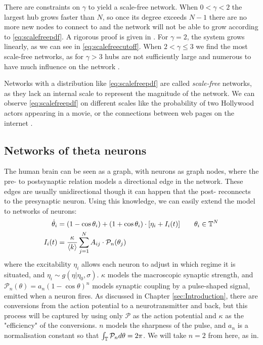 There are constraints on $\gamma$ to yield a scale-free network. When $0 < \gamma < 2$ the largest hub grows faster than $N$, so once its degree exceeds $N-1$ there are no more new nodes to connect to and the network will not be able to grow according to \eqref{eq:scalefreepdf}. A rigorous proof is given in \cite{Bassler2011}. For $\gamma = 2$, the system grows linearly, as we can see in \eqref{eq:scalefreecutoff}. When $2 < \gamma \leq 3$ we find the most scale-free networks, as for $\gamma > 3$ hubs are not sufficiently large and numerous to have much influence on the network
\cite{BarabasiNetworkBook2016}.

Networks with a distribution like \eqref{eq:scalefreepdf} are called \textit{scale-free} networks, as they lack an internal scale to represent the magnitude of the network. We can observe \eqref{eq:scalefreepdf} on different scales like the probability of two Hollywood actors appearing in a movie, or the connections between web pages on the internet \cite{Barabasi2003}.


\subsection{Networks of theta neurons}
The human brain can be seen as a graph, with neurons as graph nodes, where the pre- to postsynaptic relation models a directional edge in the network. These edges are usually unidirectional though it can happen that the post- reconnects to the presynaptic neuron. Using this knowledge, we can easily extend the model to networks of neurons:
\begin{align}
\dot{\theta}_{i} &=\left(1-\cos \theta_{i}\right)+\left(1+\cos \theta_{i}\right) \cdot \left[\eta_{i} + I_{i}(t)\right] \qquad \theta_i \in \T^N  \label{eq:thetaneuronnetwork} \\
I_{i}(t) &=\frac{\kappa}{\kmean} \sum_{j=1}^{N} A_{i j} \cdot \mathcal{P}_{n}(\theta_{j}) \label{eq:thetaneuronnetworkcurrent}
\end{align}
where the excitability $\eta_i$ allows each neuron to adjust in which regime it is situated, and $\eta_i \sim g(\eta \rvert \eta_0, \sigma)$. $\kappa$ models the macroscopic synaptic strength, and $\mathcal{P}_n(\theta)  = a_n(1 - \cos \theta)^n$ models synaptic coupling by a pulse-shaped signal, emitted when a neuron fires. As discussed in Chapter \ref{sec:Introduction}, there are conversions from the action potential to a neurotransmitter and back, but this process will be captured by using only $\mathcal{P}$ as the action potential and $\kappa$ as the "efficiency" of the conversions. $n$ models the sharpness of the pulse, and $a_n$ is a normalisation constant so that $\int_{{\mathbb{T}}} \mathcal{P}_{n} d \theta=2 \pi$. We will take $n=2$ from here, as in\cite{Luke2013, OttAntonsen2017, Martens2020}. 

